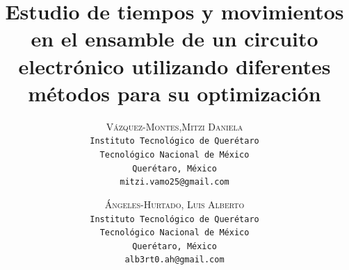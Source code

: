     \lfoot{ \thepage}
    
    \setlength{\droptitle}{-5\baselineskip} %
    \title{\textbf{Estudio de tiempos y movimientos en el ensamble de un circuito electrónico utilizando diferentes métodos para su optimización }} %
    
     \author{ 
         \textsc{Vázquez-Montes,Mitzi Daniela}\\ 
         \texttt{Instituto Tecnológico de Querétaro} \\ 
         \texttt{Tecnológico Nacional de México} \\ 
         \texttt{Querétaro, México}\\ 
         \texttt{mitzi.vamo25@gmail.com}
     \and 
     \textsc{Ángeles-Hurtado, Luis Alberto}\\ 
     \texttt{ Instituto Tecnológico de Querétaro } \\ 
     \texttt{ Tecnológico Nacional de México } \\ 
     \texttt{Querétaro, México}\\ 
     \texttt{alb3rt0.ah@gmail.com} 
    }
    
    
    
    
